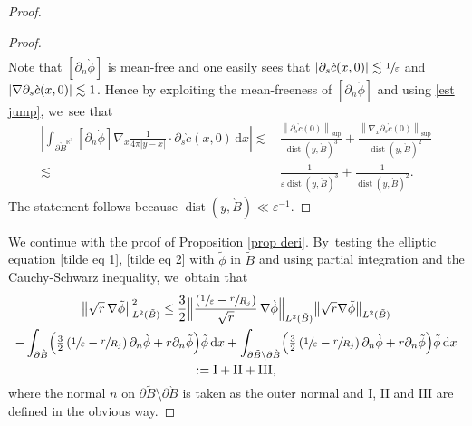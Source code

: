 \documentclass[JEP,XML,SOM,Unicode,published]{cedram}
\let\epsilon\varepsilon
\let\backslash\setminus
\newcommand{\rI}{\mathrm{I}}
\newcommand{\rII}{\mathrm{II}}
\newcommand{\rIII}{\mathrm{III}}
\theoremstyle{definition}
\DeclareMathOperator{\dist}{dist}
\newcommand\R{\mathbb{R}}
\newcommand\norm[1]{\left\lVert #1\right\rVert}
\newcommand\bnorm[1]{\bigl\lVert #1\bigr\rVert}
\newcommand\Bnorm[1]{\Bigl\lVert #1\Bigr\rVert}
\newcommand\dd{\,\mathrm{d}}
\newcommand\dx{\dd x}
\let\de\partial
\let\eps\epsilon
\let\mel\relax
\begin{document}
\begin{proof}
\begin{proof}
\begin{align*}
\end{align*}
Note that $[\de_n\grave{\phi}]$ is mean-free and one easily sees that $|\de_s\grave{c}(x,0)|\lesssim \sfrac{1}{\eps}$ and $|\nabla\de_s\grave{c}(x,0)|\lesssim\nobreak 1$. Hence by exploiting the mean-freeness of $[\de_n\grave{\phi}]$ and using \eqref{est jump}, we~see that
\begin{align*}
\left|\int_{\de\grave{B}^{\R^3}}[\de_n\grave{\phi}]\nabla_x\frac{1}{4\pi|y-x|}\cdot \de_s\grave{c}(x,0)\dx\right|\lesssim & \frac{\norm{\de_s\grave{c}(0)}_{\sup}}{\dist(y,\grave{B})^3}+\frac{\norm{\nabla_x\de_s\grave{c}(0)}_{\sup}}{\dist(y,\grave{B})^2}\\
\lesssim& \frac{1}{\eps\dist(y,\grave{B})^3}+\frac{1}{\dist(y,\grave{B})^2}.
\end{align*}
The statement follows because $\dist(y,\grave{B})\ll\eps^{-1}$.
\end{proof}

\pagebreak[2]
We continue with the proof of Proposition \ref{prop deri}. By~testing the elliptic equation \eqref{tilde eq 1}, \eqref{tilde eq 2} with $\tilde{\phi}$ in $\tilde{B}$ and using partial integration and the Cauchy-Schwarz inequality, we~obtain that\vspace*{-5pt}
\begin{multline}\label{est tilde}
\mel\bnorm{\sqrt{r}\,\nabla\tilde{\phi}}_{L^2(\tilde{B})}^2\leq \frac{3}{2}\Bnorm{\frac{\left(\sfrac{1}{\eps}-\sfrac{r}{R_j}\right)}{\sqrt{r}}\,\nabla\grave{\phi}}_{L^2(\tilde{B})}\bnorm{\sqrt{r}\nabla\tilde{\phi}}_{L^2(\tilde{B})}\\
-\int_{\de \grave{B}}\Bigl(\tfrac{3}{2}\left(\sfrac{1}{\eps}-\sfrac{r}{R_j}\right)\de_n\grave{\phi}+r\de_n\tilde{\phi}\Bigr)\tilde{\phi}\dx+\int_{\de \tilde{B}\backslash\de\grave{B}}\Bigl(\tfrac{3}{2}\left(\sfrac{1}{\eps}-\sfrac{r}{R_j}\right)\de_n\grave{\phi}+r\de_n\tilde{\phi}\Bigr)\tilde{\phi}\dx\\
\mel:=\rI+\rII+\rIII,
\end{multline}
where the normal $n$ on $\de \tilde{B}\backslash\de\grave{B}$ is taken as the outer normal and $\rI$, $\rII$ and $\rIII$ are defined in the obvious way.


\end{proof}
\end{document}
